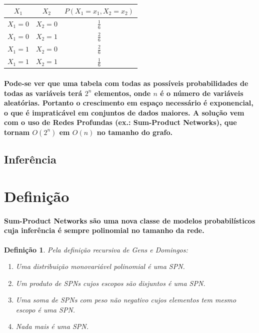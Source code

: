 \documentclass[a4paper,10pt]{article}
\theoremstyle{plain}
\newtheorem*{spn-def}{Definição}
\begin{document}
\begin{table}[h*]
\caption{}
\begin{tabular}{*{3}{c}}
$X_1$ & $X_2$ & $P(X_1=x_1,X_2=x_2)$ \\
\hline
$X_1=0$ & $X_2=0$ & $\frac{1}{6}$ \\
$X_1=0$ & $X_2=1$ & $\frac{2}{6}$ \\
$X_1=1$ & $X_2=0$ & $\frac{2}{6}$ \\
$X_1=1$ & $X_2=1$ & $\frac{1}{6}$ \\
\end{tabular}
\end{table}

\paragraph{
  Pode-se ver que uma tabela com todas as possíveis probabilidades de todas as variáveis terá $2^n$ elementos, 
onde $n$ é o número de variáveis aleatórias. Portanto o crescimento em espaço necessário é exponencial, o que
é impraticável em conjuntos de dados maiores. A solução vem com o uso de Redes Profundas (ex.: Sum-Product Networks), 
que tornam $O(2^n)$ em $O(n)$ no tamanho do grafo.
}

\subsection{Inferência}



\section{Definição}

\paragraph{
  Sum-Product Networks são uma nova classe de modelos probabilísticos cuja inferência é sempre
polinomial no tamanho da rede.
}

\begin{spn-def} Pela definição recursiva de Gens e Domingos\cite{gens-domingos}:
\begin{enumerate} \itemsep0pt
  \item Uma distribuição monovariável polinomial é uma SPN.
  \item Um produto de SPNs cujos escopos são disjuntos é uma SPN.
  \item Uma soma de SPNs com peso não negativo cujos elementos tem mesmo escopo é uma SPN.
  \item Nada mais é uma SPN.
\end{enumerate}
\end{spn-def}
\end{document}
